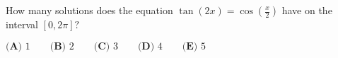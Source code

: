 How many solutions does the equation $\tan{(2x)} = \cos{(\tfrac{x}{2})}$ have on the interval $[0, 2\pi]?$

$\textbf{(A) } 1 \qquad \textbf{(B) } 2 \qquad \textbf{(C) } 3 \qquad \textbf{(D) } 4 \qquad \textbf{(E) } 5$
